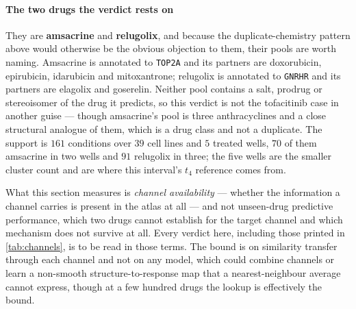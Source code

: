 \paragraph{The two drugs the verdict rests on} They are \textbf{amsacrine} and
\textbf{relugolix}, and because the duplicate-chemistry pattern above would
otherwise be the obvious objection to them, their pools are worth naming.
Amsacrine is annotated to \texttt{TOP2A} and its partners are doxorubicin,
epirubicin, idarubicin and mitoxantrone; relugolix is annotated to
\texttt{GNRHR} and its partners are elagolix and goserelin. Neither pool
contains a salt, prodrug or stereoisomer of the drug it predicts, so this
verdict is not the tofacitinib case in another guise --- though amsacrine's
pool is three anthracyclines and a close structural analogue of them, which is
a drug class and not a duplicate. The support is $\num{161}$ conditions over
$39$ cell lines and $5$ treated wells, $70$ of them amsacrine in two wells and
$91$ relugolix in three; the five wells are the smaller cluster count and are
where this interval's $t_4$ reference comes from.

\begin{scopelimit}
What this section measures is \emph{channel availability} --- whether the
information a channel carries is present in the atlas at all --- and not
unseen-drug predictive performance, which two drugs cannot establish for the
target channel and which mechanism does not survive at all. Every verdict here,
including those printed in \cref{tab:channels}, is to be read in those terms. The
bound is on similarity transfer through each channel and not on any model, which
could combine channels or learn a non-smooth structure-to-response map that a
nearest-neighbour average cannot express, though at a few hundred drugs the
lookup is effectively the bound.
\end{scopelimit}

